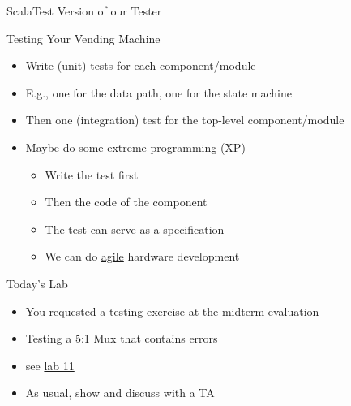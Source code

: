 \begin{frame}[fragile]{ScalaTest Version of our Tester}
\end{frame}

\begin{frame}[fragile]{Testing Your Vending Machine}
\begin{itemize}
\item Write (unit) tests for each component/module
\item E.g., one for the data path, one for the state machine
\item Then one (integration) test for the top-level component/module
\item Maybe do some \href{https://en.wikipedia.org/wiki/Extreme_programming}{extreme programming (XP)}
\begin{itemize}
\item Write the test first
\item Then the code of the component
\item The test can serve as a specification
\item We can do \href{https://en.wikipedia.org/wiki/Agile_software_development}{agile} hardware development
\end{itemize}
\end{itemize}
\end{frame}

\begin{frame}[fragile]{Today's Lab}
\begin{itemize}
\item You requested a testing exercise at the midterm evaluation
\item Testing a 5:1 Mux that contains errors
\item see \href{https://github.com/schoeberl/chisel-lab/tree/master/lab11}{lab 11}
\item As usual, show and discuss with a TA
\end{itemize}
\end{frame}



